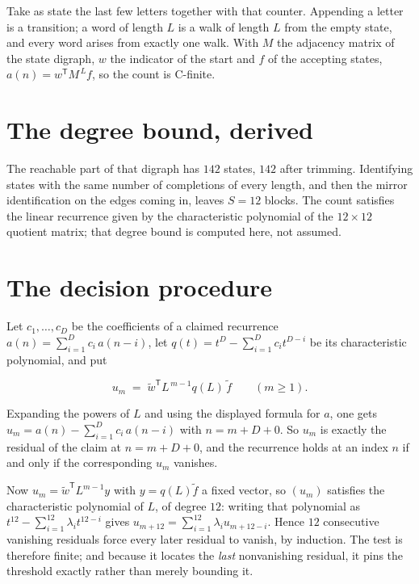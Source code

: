 \documentclass[11pt]{article}
\theoremstyle{definition}
\begin{document}
Take as state the last few letters together with that counter. Appending a letter is a transition; a word of length $L$ is a walk of length $L$ from the empty state, and every word arises from exactly one walk. With $M$ the adjacency matrix of the state digraph, $w$ the indicator of the start and $f$ of the accepting states, $a(n) = w^{\mathsf T}M^{\,L}f$, so the count is C-finite.

\section{The degree bound, derived}

The reachable part of that digraph has $142$ states, $142$ after trimming. Identifying states with the same number of completions of every length, and then the mirror identification on the edges coming in, leaves $S = 12$ blocks. The count satisfies the linear recurrence given by the characteristic polynomial of the $12\times12$ quotient matrix; that degree bound is computed here, not assumed.

\section{The decision procedure}

Let $c_1,\dots,c_D$ be the coefficients of a claimed recurrence $a(n) = \sum_{i=1}^{D} c_i\,a(n-i)$, let $q(t) = t^{D} - \sum_{i=1}^{D} c_i t^{D-i}$ be its characteristic polynomial, and put

\[u_m \;=\; \tilde w^{\mathsf T} L^{\,m-1} q(L)\,\tilde f \qquad (m \ge 1).\]

Expanding the powers of $L$ and using the displayed formula for $a$, one gets $u_m = a(n) - \sum_{i=1}^{D} c_i\,a(n-i)$ with $n = m + D + 0$. So $u_m$ is exactly the residual of the claim at $n = m + D + 0$, and the recurrence holds at an index $n$ if and only if the corresponding $u_m$ vanishes.

Now $u_m = \tilde w^{\mathsf T} L^{m-1} y$ with $y = q(L)\tilde f$ a fixed vector, so $(u_m)$ satisfies the characteristic polynomial of $L$, of degree $12$: writing that polynomial as $t^{12} - \sum_{i=1}^{12} \lambda_i t^{12-i}$ gives $u_{m+12} = \sum_{i=1}^{12} \lambda_i u_{m+12-i}$. Hence $12$ consecutive vanishing residuals force every later residual to vanish, by induction. The test is therefore finite; and because it locates the {\itshape last} nonvanishing residual, it pins the threshold exactly rather than merely bounding it.
\end{document}
